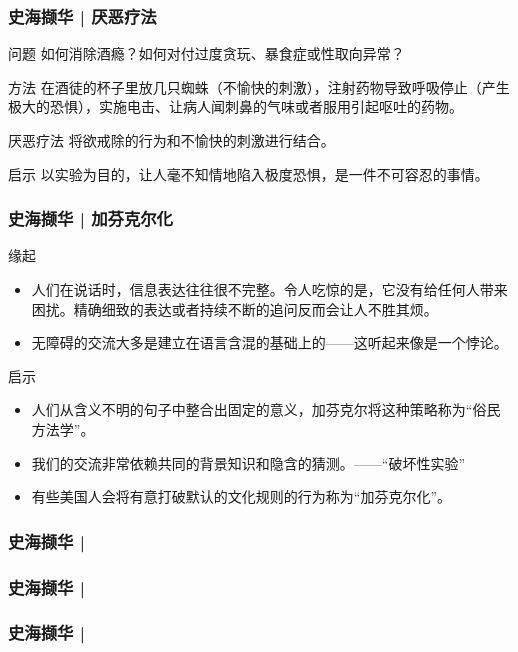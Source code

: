 \begin{frame}
  \frametitle{史海撷华 | 厌恶疗法}
  \begin{block}{问题}
    如何消除酒瘾？如何对付过度贪玩、暴食症或性取向异常？
  \end{block}
  \pause
  \begin{block}{方法}
在酒徒的杯子里放几只蜘蛛（不愉快的刺激），注射药物导致呼吸停止（产生极大的恐惧），实施电击、让病人闻刺鼻的气味或者服用引起呕吐的药物。
  \end{block}
  \pause
  \begin{block}{厌恶疗法}
    将欲戒除的行为和不愉快的刺激进行结合。
  \end{block}
  \pause
  \begin{block}{启示}
    以实验为目的，让人毫不知情地陷入极度恐惧，是一件不可容忍的事情。
  \end{block}
\end{frame}

\begin{frame}
  \frametitle{史海撷华 | 加芬克尔化}
  \begin{block}{缘起}
    \begin{itemize}
      \item 人们在说话时，信息表达往往很不完整。令人吃惊的是，它没有给任何人带来困扰。精确细致的表达或者持续不断的追问反而会让人不胜其烦。
      \item 无障碍的交流大多是建立在语言含混的基础上的——这听起来像是一个悖论。
    \end{itemize}
  \end{block}
  \pause
  \begin{block}{启示}
    \begin{itemize}
      \item 人们从含义不明的句子中整合出固定的意义，加芬克尔将这种策略称为“俗民方法学”。
      \item 我们的交流非常依赖共同的背景知识和隐含的猜测。——“破坏性实验”
      \item 有些美国人会将有意打破默认的文化规则的行为称为“加芬克尔化”。
    \end{itemize}
  \end{block}
\end{frame}

% 
\begin{frame}
  \frametitle{史海撷华 | }
\end{frame}

% 
\begin{frame}
  \frametitle{史海撷华 | }
\end{frame}

% 
\begin{frame}
  \frametitle{史海撷华 | }
\end{frame}



